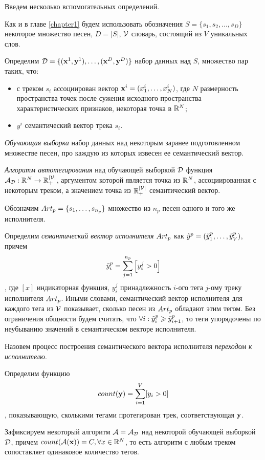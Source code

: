 Введем несколько вспомогательных определений.

Как и в главе \ref{chapter1} будем использовать обозначения $S = \{s_1, s_2, \ldots, s_D \}$ \ld некоторое множество песен, $D = |S|$, $ \mathcal{V} $ \ld словарь, состоящий из $V$ уникальных слов.

Определим $\mathcal{D} = \{ (\mathbf{x}^1, \mathbf{y}^1), \ldots, (\mathbf{x}^D, \mathbf{y}^D) \}$ \ld набор данных над $S$, множество пар таких, 
что:
\begin{itemize}
 \item с треком $s_i$ ассоциирован вектор $\mathbf{x}^i = (x^i_1, \ldots, x^i_N)$, где $N$ \ld размерность пространства точек после сужения 
 исходного пространства характеристических признаков, \ld некоторая точка в $\mathbb{R}^N$;
 \item $y^i$ \ld семантический вектор трека $s_i$.
\end{itemize}

\emph{Обучающая выборка} \ld набор данных над некоторым заранее подготовленном множестве песен, про каждую из которых извесен ее семантический вектор.

\emph{Алгоритм автотегирования} над обучающей выборкой $\mathcal{D}$ \ld функция ${\mathcal{A}}_{\mathcal{D}} : \mathbb{R}^N \rightarrow \mathbb{R}^{|{\mathcal{V}}|}_{+}$,
аргументом которой является точка из $\mathbb{R}^N$, ассоциированная с некоторым треком, а значением \ld точка из $\mathbb{R}^{|{\mathcal{V}}|}_{+}$ \ld семантический вектор.

Обозначим ${Art}_p = \{s_1, \ldots, s_{n_p} \}$ множество из $n_p$ песен одного и того же исполнителя.

Определим \emph{семантический вектор исполнителя} ${Art}_p$ как $\tilde{y}^p = (\tilde{y}^p_1, \ldots, \tilde{y}^p_{V})$, причем 
$$\tilde{y}^p_i = \sum^{n_p}_{j=1} \left [y^j_i > 0 \right ]$$,
где $[x]$ \ld индикаторная функция, $y^j_i$ \ld принадлежность $i$-ого тега $j$-ому треку исполнителя ${Art}_p$. Иными словами, семантический вектор исполнителя
для каждого тега из $\mathcal{V}$ показывает, сколько песен из ${Art}_p$ обладают этим тегом.
Без ограничения общности будем считать, что $\forall i: \tilde{y}^p_i \geqslant \tilde{y}^p_{i+1}$, то теги упорядочены по неубыванию значений в семантическом векторе исполнителя.

Назовем процесс построения семантического вектора исполнителя \emph{переходом к исполнителю}.

Определим функцию $$count(\mathbf{y}) = \sum^{V}_{i=1} [y_i > 0]$$,
показывающую, сколькими тегами протегирован трек, соответствующая $\mathbf{y}$.

Зафиксируем некоторый алгоритм $\mathcal{A} = \mathcal{A}_{\mathcal{D}}$ над некоторой обучающей выборкой $\mathcal{D}$, причем $count(\mathcal{A}(\mathbf{x})) = C, \forall x \in \mathbb{R}^N$,
то есть алгоритм с любым треком сопоставляет одинаковое количество тегов.

